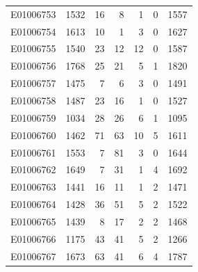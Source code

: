 \documentclass[
  letterpaper,
  DIV=11,
  numbers=noendperiod]{scrreprt}
\begin{document}
\begin{tabular}{lrrrrrr}
E01006753     &    1532 &      16 &                     8 &                               1 &                       0 &              1557 \\
E01006754     &    1613 &      10 &                     1 &                               3 &                       0 &              1627 \\
E01006755     &    1540 &      23 &                    12 &                              12 &                       0 &              1587 \\
E01006756     &    1768 &      25 &                    21 &                               5 &                       1 &              1820 \\
E01006757     &    1475 &       7 &                     6 &                               3 &                       0 &              1491 \\
E01006758     &    1487 &      23 &                    16 &                               1 &                       0 &              1527 \\
E01006759     &    1034 &      28 &                    26 &                               6 &                       1 &              1095 \\
E01006760     &    1462 &      71 &                    63 &                              10 &                       5 &              1611 \\
E01006761     &    1553 &       7 &                    81 &                               3 &                       0 &              1644 \\
E01006762     &    1649 &       7 &                    31 &                               1 &                       4 &              1692 \\
E01006763     &    1441 &      16 &                    11 &                               1 &                       2 &              1471 \\
E01006764     &    1428 &      36 &                    51 &                               5 &                       2 &              1522 \\
E01006765     &    1439 &       8 &                    17 &                               2 &                       2 &              1468 \\
E01006766     &    1175 &      43 &                    41 &                               5 &                       2 &              1266 \\
E01006767     &    1673 &      63 &                    41 &                               6 &                       4 &              1787 \\

\end{tabular}
\end{document}
